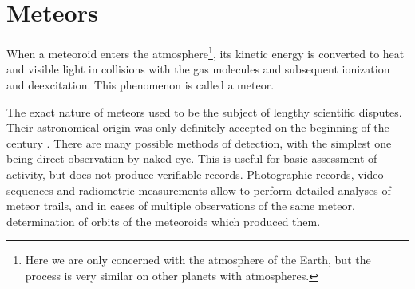 
\section{Meteors} \label{il}
    When a meteoroid enters the atmosphere\footnote{Here we are only concerned with the atmosphere of the Earth,
    but the process is very similar on other planets with atmospheres.}, its kinetic energy
    is converted to heat and visible light in collisions with the gas molecules and subsequent ionization
    and deexcitation. This phenomenon is called a meteor.

    The exact nature of meteors used to be the subject of lengthy scientific disputes.
    Their astronomical origin was only definitely accepted on the beginning of the  century \citep{czegka2000}.
    There are many possible methods of detection, with the simplest one being direct observation by naked eye.
    This is useful for basic assessment of activity, but does not produce verifiable records.
    Photographic records, video sequences and radiometric measurements allow to perform detailed analyses of meteor trails,
    and in cases of multiple observations of the same meteor, determination of orbits of the meteoroids which produced them.

